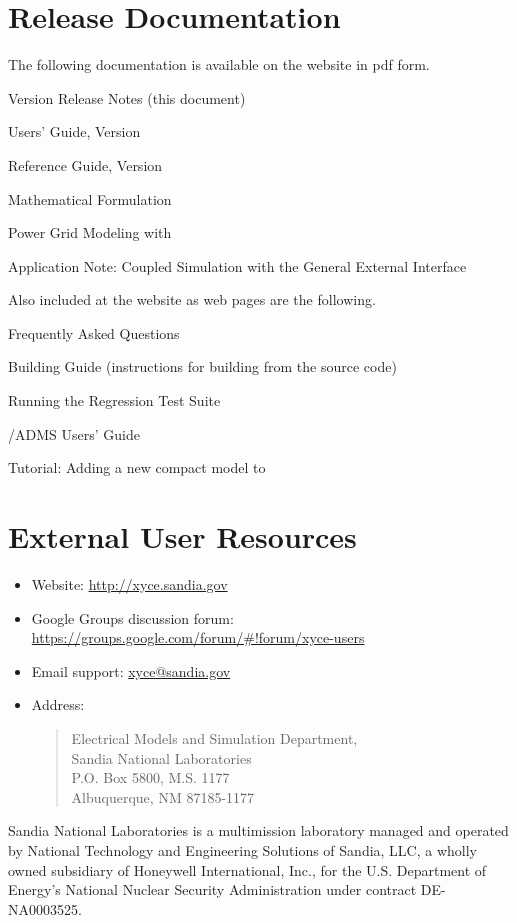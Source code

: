 \documentclass{article}
\begin{document}
\section{\Xyce{} Release \XyceVersionVar{} Documentation}
The following \Xyce{} documentation is available on the \Xyce{} website in pdf
form.
\begin{XyceItemize}
  \item \Xyce{} Version \XyceVersionVar{} Release Notes (this document)
  \item \Xyce{} Users' Guide, Version \XyceVersionVar{}
  \item \Xyce{} Reference Guide, Version \XyceVersionVar{}
  \item \Xyce{} Mathematical Formulation
  \item Power Grid Modeling with \Xyce{}
  \item Application Note: Coupled Simulation with the \Xyce{} General
    External Interface
\end{XyceItemize}
Also included at the \Xyce{} website as web pages are the following.
\begin{XyceItemize}
  \item Frequently Asked Questions
  \item Building Guide (instructions for building \Xyce{} from the source code)
  \item Running the \Xyce{} Regression Test Suite
  \item \Xyce{}/ADMS Users' Guide
  \item Tutorial:  Adding a new compact model to \Xyce{}
\end{XyceItemize}


\section{External User Resources}
\begin{itemize}
  \item Website: {\color{XyceDeepRed}\url{http://xyce.sandia.gov}}
  \item Google Groups discussion forum:
    {\color{XyceDeepRed}\url{https://groups.google.com/forum/#!forum/xyce-users}}
  \item Email support:
    {\color{XyceDeepRed}\href{mailto:xyce@sandia.gov}{xyce@sandia.gov}}
  \item Address:
    \begin{quote}
            Electrical Models and Simulation Department,\\
            Sandia National Laboratories\\
            P.O. Box 5800, M.S. 1177\\
            Albuquerque, NM 87185-1177 \\
    \end{quote}
\end{itemize}

\vspace*{\fill}
Sandia National Laboratories is a multimission laboratory managed and
operated by National Technology and Engineering Solutions of Sandia,
LLC, a wholly owned subsidiary of Honeywell International, Inc., for
the U.S. Department of Energy's National Nuclear Security
Administration under contract DE-NA0003525.
\end{document}

